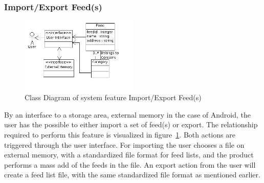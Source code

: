 \newpage
\subsubsection{Import/Export Feed(s)}
\begin{figure}[hbt]
\centering
\includegraphics[width=0.5\textwidth]
{./images/ImportExportFeeds.png}
\caption{Class Diagram of system feature Import/Export Feed(s)}
\label{fig:import}
\end{figure}
By an interface to a storage area, external memory in the case of Android, the user has the possible to either import a set of feed(s) or export. The relationship required to perform this feature is visualized in figure~\ref{fig:import}. Both actions are triggered through the user interface. For importing the user chooses a file on external memory, with a standardized file format for feed lists, and the product performs a mass add of the feeds in the file. An export action from the user will create a feed list file, with the same standardized file format as mentioned earlier. \\
